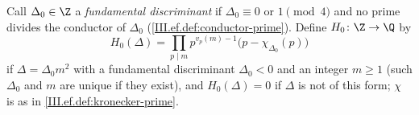 Call $\Delta_0\in\Z$ a \emph{fundamental discriminant} if $\Delta_0\equiv0$ or $1\pmod4$ and no prime divides the conductor of $\Delta_0$
(\cref{III.ef.def:conductor-prime}). Define $H_0\colon\Z\to\Q$ by
\[
  H_0(\Delta)=\prod_{p\mid m}p^{v_p(m)-1}\bigl(p-\chi_{\Delta_0}(p)\bigr)
\]
if $\Delta=\Delta_0m^2$ with a fundamental discriminant $\Delta_0<0$ and an integer $m\ge1$ (such $\Delta_0$ and $m$ are unique if they exist), and
$H_0(\Delta)=0$ if $\Delta$ is not of this form; $\chi$ is as in \cref{III.ef.def:kronecker-prime}.
